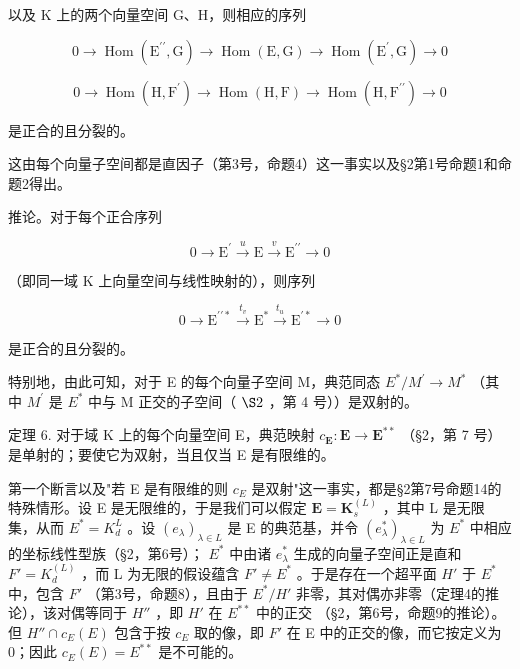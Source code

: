 以及 K 上的两个向量空间 G、H，则相应的序列

\[
0 \rightarrow \operatorname{Hom} (\mathrm{E} ^ {\prime \prime}, \mathrm{G}) \rightarrow \operatorname{Hom} (\mathrm{E}, \mathrm{G}) \rightarrow \operatorname{Hom} (\mathrm{E} ^ {\prime}, \mathrm{G}) \rightarrow 0
\]

\[
0 \rightarrow \operatorname{Hom} (\mathrm{H}, \mathrm{F} ^ {\prime}) \rightarrow \operatorname{Hom} (\mathrm{H}, \mathrm{F}) \rightarrow \operatorname{Hom} (\mathrm{H}, \mathrm{F} ^ {\prime \prime}) \rightarrow 0
\]

是正合的且分裂的。

这由每个向量子空间都是直因子（第3号，命题4）这一事实以及§2第1号命题1和命题2得出。

推论。对于每个正合序列

\[
0 \longrightarrow \mathrm{E} ^ {\prime} \stackrel {u} {\longrightarrow} \mathrm{E} \stackrel {v} {\longrightarrow} \mathrm{E} ^ {\prime \prime} \longrightarrow 0
\]

（即同一域 K 上向量空间与线性映射的），则序列

\[
0 \longrightarrow \mathrm{E} ^ {\prime \prime *} \stackrel {t _ {v}} {\longrightarrow} \mathrm{E} ^ {*} \stackrel {t _ {u}} {\longrightarrow} \mathrm{E} ^ {\prime *} \longrightarrow 0
\]

是正合的且分裂的。

特别地，由此可知，对于 E 的每个向量子空间 M，典范同态 \(E^{*}/M^{\prime} \rightarrow M^{*}\) （其中 \(M^{\prime}\) 是 \(E^{*}\) 中与 M 正交的子空间（ \(\S 2\) ，第 4 号））是双射的。

定理 6. 对于域 K 上的每个向量空间 E，典范映射 \(c_{\mathbf{E}}: \mathbf{E} \to \mathbf{E}^{**}\) （§2，第 7 号）是单射的；要使它为双射，当且仅当 E 是有限维的。

第一个断言以及"若 E 是有限维的则 \(c_{E}\) 是双射"这一事实，都是§2第7号命题14的特殊情形。设 E 是无限维的，于是我们可以假定 \(\mathbf{E} = \mathbf{K}_{s}^{(L)}\) ，其中 L 是无限集，从而 \(E^{*} = K_{d}^{L}\) 。设 \((e_{\lambda})_{\lambda \in L}\) 是 E 的典范基，并令 \((e_{\lambda}^{*})_{\lambda \in L}\) 为 \(E^{*}\) 中相应的坐标线性型族（§2，第6号）； \(E^{*}\) 中由诸 \(e_{\lambda}^{*}\) 生成的向量子空间正是直和 \(F' = K_{d}^{(L)}\) ，而 L 为无限的假设蕴含 \(F' \neq E^{*}\) 。于是存在一个超平面 \(H'\) 于 \(E^{*}\) 中，包含 \(F'\) （第3号，命题8），且由于 \(E^{*}/H'\) 非零，其对偶亦非零（定理4的推论），该对偶等同于 \(H''\) ，即 \(H'\) 在 \(E^{**}\) 中的正交 （§2，第6号，命题9的推论）。但 \(H'' \cap c_{E}(E)\) 包含于按 \(c_{E}\) 取的像，即 \(F'\) 在 E 中的正交的像，而它按定义为 0；因此 \(c_{E}(E) = E^{**}\) 是不可能的。

